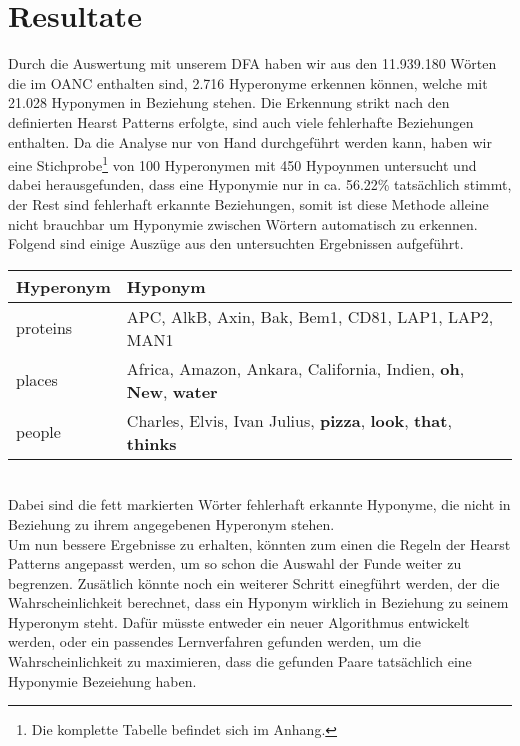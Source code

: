 \section{Resultate}%
%
Durch die Auswertung mit unserem DFA haben wir aus den 11.939.180 Wörten
die im OANC enthalten sind, 2.716 Hyperonyme erkennen können, welche
mit 21.028 Hyponymen in Beziehung stehen. Die Erkennung strikt nach
den definierten Hearst Patterns erfolgte, sind auch viele fehlerhafte
Beziehungen enthalten. Da die Analyse nur von Hand durchgeführt werden
kann, haben wir eine Stichprobe\footnote{Die komplette Tabelle
  befindet sich im Anhang.} von 100 Hyperonymen mit 450 Hypoynmen
untersucht und dabei herausgefunden, dass eine Hyponymie nur in ca.
56.22\% tatsächlich stimmt, der Rest sind fehlerhaft erkannte
Beziehungen, somit ist diese Methode alleine nicht brauchbar um
Hyponymie zwischen Wörtern automatisch zu erkennen. Folgend sind einige
Auszüge aus den untersuchten Ergebnissen aufgeführt.%
%
\begin{longtable}{|l|l|}
  \hline
  \textbf{Hyperonym} & \textbf{Hyponym} \\
  \hline
  proteins & APC, AlkB, Axin, Bak, Bem1, CD81, LAP1,
  LAP2, MAN1 \\
  \hline
  places & Africa, Amazon, Ankara, California, Indien, \textbf{oh},
  \textbf{New}, \textbf{water} \\
  \hline
  people & Charles, Elvis, Ivan Julius,
  \textbf{pizza}, \textbf{look}, \textbf{that}, \textbf{thinks} \\
  \hline
\end{longtable}%
~\\%
Dabei sind die fett markierten Wörter fehlerhaft erkannte Hyponyme,
die nicht in Beziehung zu ihrem angegebenen Hyperonym stehen.%
\\%
Um nun bessere Ergebnisse zu erhalten, könnten zum einen die Regeln
der Hearst Patterns angepasst werden, um so schon die Auswahl der
Funde weiter zu begrenzen. Zusätlich könnte noch ein weiterer
Schritt einegführt werden, der die Wahrscheinlichkeit berechnet, dass
ein Hyponym wirklich in Beziehung zu seinem Hyperonym steht. Dafür
müsste entweder ein neuer Algorithmus entwickelt werden, oder ein
passendes Lernverfahren gefunden werden, um die Wahrscheinlichkeit zu
maximieren, dass die gefunden Paare tatsächlich eine Hyponymie
Bezeiehung haben.